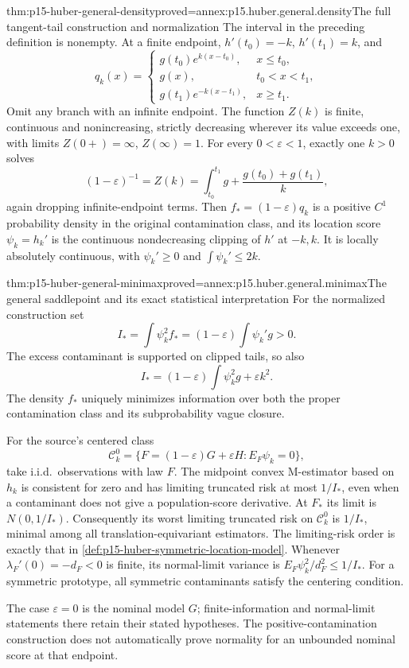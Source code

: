 \begin{hbtheorem}{thm:p15-huber-general-density}{proved=annex:p15.huber.general.density}{The full tangent-tail construction and normalization}
The interval in the preceding definition is nonempty.
At a finite endpoint, \(h'(t_0)=-k\), \(h'(t_1)=k\), and
\[
 q_k(x)=
 \begin{cases}
 g(t_0)e^{k(x-t_0)},&x\leq t_0,\\
 g(x),&t_0<x<t_1,\\
 g(t_1)e^{-k(x-t_1)},&x\geq t_1 .
 \end{cases}
\]
Omit any branch with an infinite endpoint.
The function \(Z(k)\) is finite, continuous and nonincreasing,
strictly decreasing wherever its value exceeds one, with limits
\(Z(0+)=\infty\), \(Z(\infty)=1\).
For every \(0<\varepsilon<1\), exactly one \(k>0\) solves
\[
 (1-\varepsilon)^{-1}=Z(k)
 =\int_{t_0}^{t_1}g+\frac{g(t_0)+g(t_1)}k,
\]
again dropping infinite-endpoint terms.
Then \(f_*=(1-\varepsilon)q_k\) is a positive \(C^1\) probability
density in the original contamination class, and its location score
\(\psi_k=h_k'\) is the continuous nondecreasing clipping of \(h'\)
at \(-k,k\). It is locally absolutely continuous, with
\(\psi_k'\geq0\) and \(\int\psi_k'\leq2k\).
\end{hbtheorem}

\begin{hbtheorem}{thm:p15-huber-general-minimax}{proved=annex:p15.huber.general.minimax}{The general saddlepoint and its exact statistical interpretation}
For the normalized construction set
\[
 I_*=\int\psi_k^2f_*=(1-\varepsilon)\int\psi_k'g>0.
\]
The excess contaminant is supported on clipped tails, so also
\[
 I_*=(1-\varepsilon)\int\psi_k^2g+\varepsilon k^2.
\]
The density \(f_*\) uniquely minimizes information over both the
proper contamination class and its subprobability vague closure.

For the source's centered class
\[
 \mathcal C_k^0=\{F=(1-\varepsilon)G+\varepsilon H:E_F\psi_k=0\},
\]
take i.i.d.\ observations with law \(F\).
The midpoint convex M-estimator based on \(h_k\) is consistent for zero
and has limiting truncated risk at most \(1/I_*\), even when a
contaminant does not give a population-score derivative.
At \(F_*\) its limit is \(N(0,1/I_*)\).
Consequently its worst limiting truncated risk on \(\mathcal C_k^0\)
is \(1/I_*\), minimal among all translation-equivariant estimators.
The limiting-risk order is exactly that in
\cref{def:p15-huber-symmetric-location-model}.
Whenever \(\lambda_F'(0)=-d_F<0\) is finite, its normal-limit variance
is \(E_F\psi_k^2/d_F^2\leq1/I_*\).
For a symmetric prototype, all symmetric contaminants satisfy the
centering condition.

The case \(\varepsilon=0\) is the nominal model \(G\); finite-information
and normal-limit statements there retain their stated hypotheses.
The positive-contamination construction does not automatically prove
normality for an unbounded nominal score at that endpoint.
\end{hbtheorem}

